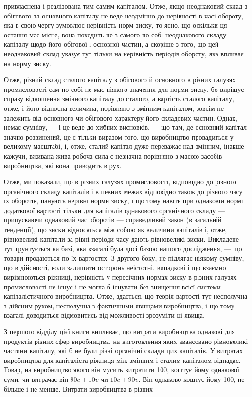 \parcont{}  %
привласнена і реалізована тим самим капіталом. Отже, якщо неоднаковий склад з обігового та основного
капіталу не веде неодмінно до нерівності в часі обороту, яка в свою чергу зумовлює нерівність норм
зиску, то ясно, що оскільки ця остання
має місце, вона походить не з самого по собі неоднакового
складу капіталу щодо його обігової і основної частин, а скоріше
з того, що цей неоднаковий склад указує тут тільки на нерівність періодів обороту, яка впливає на
норму зиску.

Отже, різний склад сталого капіталу з обігового й основного
в різних галузях промисловості сам по собі не має ніякого значення для норми зиску, бо вирішує
справу відношення змінного капіталу до сталого, а вартість сталого капіталу, отже, і його
відносна величина, порівняно з змінним капіталом, зовсім не залежить від основного чи обігового
характеру його складових
частин. Однак, немає сумніву, — і це веде до хибних висновків, — що там, де основний капітал значно
розвинений, це є
тільки виразом того, що виробництво провадиться у великому
масштабі, і, отже, сталий капітал дуже переважає над змінним,
інакше кажучи, вживана жива робоча сила є незначна порівняно з масою засобів виробництва, які вона
приводить в рух.

Отже, ми показали, що в різних галузях промисловості, відповідно до різного органічного складу
капіталів і в певних
межах відповідно також до різного часу їх оборотів, панують
нерівні норми зиску, і що тому навіть при однаковій нормі додаткової вартості тільки для капіталів
однакового органічного
складу — припускаючи однаковий час оборотів — справедливий
закон (в загальній тенденції), що зиски відносяться між собою
як величини капіталів і, отже, рівновеликі капітали за рівні
періоди часу дають рівновеликі зиски. Викладене тут грунтується
на базі, яка взагалі була досі базою нашого дослідження, — що товари продаються по їх вартостях. З
другого боку, не підлягає ніякому сумніву, що в дійсності, коли залишити осторонь
неістотні, випадкові і що взаємно вирівнюються ріжниці, нерівність у пересічних нормах зиску в
різних галузях промисловості не існує і не могла б існувати без знищення всієї системи
капіталістичного виробництва. Отже, здається, що теорія вартості тут несполучна з дійсним рухом,
несполучна
з фактичними явищами виробництва, і що тому взагалі доводиться відмовитись від можливості зрозуміти
ці явища.

З першого відділу цієї книги випливає, що витрати виробництва однакові для продуктів різних сфер
виробництва, на виготовлення яких авансовано рівновеликі частини капіталу, які б
не були різні органічні склади цих капіталів. У витратах виробництва для капіталіста ріжниця між
змінним і сталим капіталом
відпадає. Товар, на виробництво якого він мусить витратити
100, коштує йому однакової суми, чи витрачає
він $90 c + 10 v$ чи $10 c + 90 v$. Він однаково коштує йому 100, не більше і не менше. Витрати виробництва в різних
\parbreak{}  %
